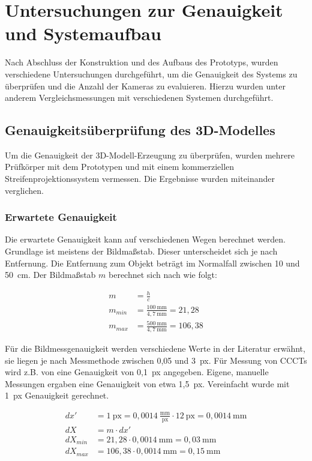 \documentclass[./00PhotoBox.tex]{subfiles}
\begin{document}
\chapter{Untersuchungen zur Genauigkeit und Systemaufbau}
Nach Abschluss der Konstruktion und des Aufbaus des Prototyps, wurden verschiedene Untersuchungen durchgeführt, um die Genauigkeit des Systems zu überprüfen und die Anzahl der Kameras zu evaluieren. Hierzu wurden unter anderem Vergleichsmessungen mit verschiedenen Systemen durchgeführt.

\section{Genauigkeitsüberprüfung des 3D-Modelles}
\label{s:genauigkeitsueberpruefung}
Um die Genauigkeit der 3D-Modell-Erzeugung zu überprüfen, wurden mehrere Prüfkörper mit dem Prototypen und mit einem kommerziellen Streifenprojektionssystem vermessen. Die Ergebnisse wurden miteinander verglichen.

\subsection{Erwartete Genauigkeit}
\label{ss:erwartete_genauigkeit}
Die erwartete Genauigkeit kann auf verschiedenen Wegen berechnet werden. Grundlage ist meistens der Bildmaßstab. Dieser unterscheidet sich je nach Entfernung. Die Entfernung zum Objekt beträgt im Normalfall zwischen 10 und 50~cm. Der Bildmaßstab $m$ berechnet sich nach \cite[S. 171]{luhmann} wie folgt:

\begin{align}
    m       & = \frac{h}{c}                                  \\
    m_{min} & = \frac{100~\text{mm}}{4,7~\text{mm}} = 21,28  \\
    m_{max} & = \frac{500~\text{mm}}{4,7~\text{mm}} = 106,38
\end{align}

Für die Bildmessgenauigkeit werden verschiedene Werte in der Literatur erwähnt, sie liegen je nach Messmethode zwischen 0,05 und 3~px. Für Messung von CCCTs wird z.B. von \cite{soot2015} eine Genauigkeit von 0,1~px angegeben.
Eigene, manuelle Messungen ergaben eine Genauigkeit von etwa 1,5~px. Vereinfacht wurde mit 1~px Genauigkeit gerechnet.

\begin{align}
    dx'      & = 1~\text{px} = 0,0014~\frac{\text{mm}}{\text{px}} \cdot 12~\text{px} = 0,0014~\text{mm} \\
    dX       & = m \cdot dx'                                                                            \\
    dX_{min} & = 21,28 \cdot 0,0014~\text{mm} = 0,03~\text{mm}                                          \\
    dX_{max} & = 106,38 \cdot 0,0014~\text{mm} = 0,15~\text{mm}
\end{align}
\end{document}
